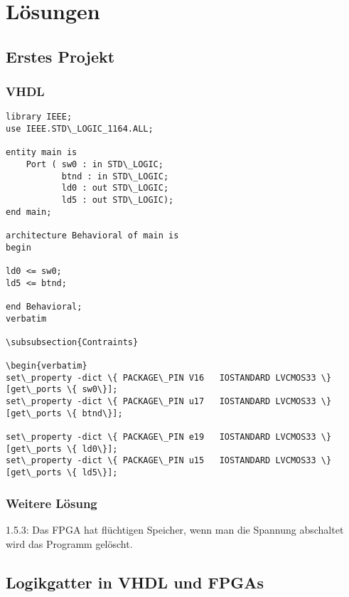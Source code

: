 \documentclass{article}
\begin{document}
\section{L\"osungen}
\subsection{Erstes Projekt}
\subsubsection{VHDL}

\begin{verbatim}
library IEEE;
use IEEE.STD\_LOGIC_1164.ALL;

entity main is
    Port ( sw0 : in STD\_LOGIC;
           btnd : in STD\_LOGIC;
           ld0 : out STD\_LOGIC;
           ld5 : out STD\_LOGIC);
end main;

architecture Behavioral of main is
begin

ld0 <= sw0;
ld5 <= btnd;

end Behavioral;
verbatim

\subsubsection{Contraints}

\begin{verbatim}
set\_property -dict \{ PACKAGE\_PIN V16   IOSTANDARD LVCMOS33 \} [get\_ports \{ sw0\}];
set\_property -dict \{ PACKAGE\_PIN u17   IOSTANDARD LVCMOS33 \} [get\_ports \{ btnd\}];

set\_property -dict \{ PACKAGE\_PIN e19   IOSTANDARD LVCMOS33 \} [get\_ports \{ ld0\}];
set\_property -dict \{ PACKAGE\_PIN u15   IOSTANDARD LVCMOS33 \} [get\_ports \{ ld5\}];
\end{verbatim}

\subsubsection{Weitere L\"osung}
1.5.3: Das FPGA hat fl\"uchtigen Speicher, wenn man die Spannung abschaltet wird das Programm gel\"oscht.

\subsection{Logikgatter in VHDL und FPGAs}
\end{document}
